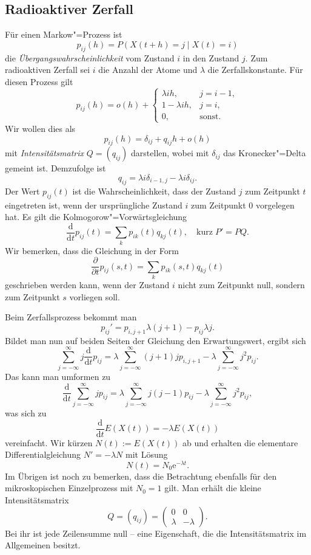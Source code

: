 \documentclass[a4paper,10pt,fleqn,twocolumn,twoside,dvipdfmx]{scrartcl}
\numberwithin{equation}{section}
\newcommand{\ee}{\mathrm e}
\theoremstyle{rmbox}
\begin{document}
\subsection{Radioaktiver Zerfall}

Für einen Markow"=Prozess ist
\[p_{ij}(h) = P(X(t+h) = j\mid X(t) = i)\]
die \emph{Übergangswahrscheinlichkeit} vom Zustand $i$ in den
Zustand $j$. Zum radioaktiven Zerfall sei $i$ die Anzahl der Atome
und $\lambda$ die Zerfallskonstante. Für diesen Prozess gilt%
\[p_{ij}(h) = o(h) + \begin{cases}
\lambda ih, & j = i-1,\\
1-\lambda ih, & j = i,\\
0, & \text{sonst}.
\end{cases}\]
Wir wollen dies als
\[p_{ij}(h) = \delta_{ij} + q_{ij}h+ o(h)\]
mit \emph{Intensitätsmatrix} $Q=(q_{ij})$ darstellen, wobei mit
$\delta_{ij}$ das Kronecker"=Delta gemeint ist. Demzufolge ist%
\[q_{ij} = \lambda i\delta_{i-1,j}-\lambda i\delta_{ij}.\]
Der Wert $p_{ij}(t)$ ist die Wahrscheinlichkeit, dass der Zustand
$j$ zum Zeitpunkt $t$ eingetreten ist, wenn der ursprüngliche Zustand
$i$ zum Zeitpunkt $0$ vorgelegen hat. Es gilt die
Kolmogorow"=Vorwärtsgleichung%
\[\frac{\mathrm d}{\mathrm dt}p_{ij}(t) = \sum_{k} p_{ik}(t)q_{kj}(t),
\quad\text{kurz}\;P' = PQ.\]
Wir bemerken, dass die Gleichung in der Form%
\[\frac{\partial}{\partial t}p_{ij}(s,t) = \sum_{k} p_{ik}(s,t)q_{kj}(t)\]
geschrieben werden kann, wenn der Zustand $i$ nicht zum Zeitpunkt
null, sondern zum Zeitpunkt $s$ vorliegen soll.

Beim Zerfallsprozess bekommt man
\[p_{ij}' = p_{i,j+1}\lambda(j+1) - p_{ij}\lambda j.\]
Bildet man nun auf beiden Seiten der Gleichung den Erwartungswert,
ergibt sich%
\[\sum_{j=-\infty}^\infty j\frac{\mathrm d}{\mathrm dt}p_{ij} = \lambda\sum_{j=-\infty}^\infty (j+1)jp_{i,j+1}
- \lambda\sum_{j=-\infty}^\infty j^2 p_{ij}.\]
Das kann man umformen zu
\[\frac{\mathrm d}{\mathrm dt}\sum_{j=-\infty}^\infty jp_{ij} =
\lambda\sum_{j=-\infty}^\infty j(j-1)p_{ij}
- \lambda\sum_{j=-\infty}^\infty j^2 p_{ij},\]
was sich zu
\[\frac{\mathrm d}{\mathrm dt}E(X(t)) = -\lambda E(X(t))\]
vereinfacht. Wir kürzen $N(t):=E(X(t))$ ab und erhalten die
elementare Differentialgleichung $N'=-\lambda N$ mit Lösung%
\[N(t) = N_0\ee^{-\lambda t}.\]
Im Übrigen ist noch zu bemerken, dass die Betrachtung ebenfalls
für den mikroskopischen Einzelprozess mit $N_0=1$ gilt.
Man erhält die kleine Intensitätsmatrix%
\[Q = (q_{ij}) = \begin{pmatrix}
0 & 0\\
\lambda & -\lambda
\end{pmatrix}.\]
Bei ihr ist jede Zeilensumme null -- eine Eigenschaft, die die
Intensitätsmatrix im Allgemeinen besitzt.
\end{document}
